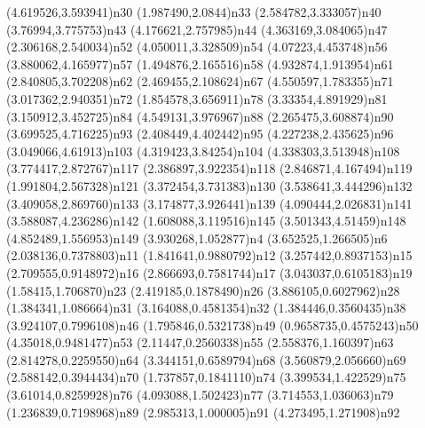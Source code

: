 \dotnode[](4.619526,3.593941){n30}
\dotnode[](1.987490,2.0844){n33}
\dotnode[](2.584782,3.333057){n40}
\dotnode[fillcolor=gray](3.76994,3.775753){n43}
\dotnode[](4.176621,2.757985){n44}
\dotnode[fillcolor=gray](4.363169,3.084065){n47}
\dotnode[](2.306168,2.540034){n52}
\dotnode[](4.050011,3.328509){n54}
\dotnode[](4.07223,4.453748){n56}
\dotnode[](3.880062,4.165977){n57}
\dotnode[](1.494876,2.165516){n58}
\dotnode[](4.932874,1.913954){n61}
\dotnode[fillcolor=gray](2.840805,3.702208){n62}
\dotnode[](2.469455,2.108624){n67}
\dotnode[](4.550597,1.783355){n71}
\dotnode[](3.017362,2.940351){n72}
\dotnode[](1.854578,3.656911){n78}
\dotnode[](3.33354,4.891929){n81}
\dotnode[](3.150912,3.452725){n84}
\dotnode[](4.549131,3.976967){n88}
\dotnode[](2.265475,3.608874){n90}
\dotnode[](3.699525,4.716225){n93}
\dotnode[](2.408449,4.402442){n95}
\dotnode[](4.227238,2.435625){n96}
\dotnode[](3.049066,4.61913){n103}
\dotnode[](4.319423,3.84254){n104}
\dotnode[](4.338303,3.513948){n108}
\dotnode[](3.774417,2.872767){n117}
\dotnode[fillcolor=gray](2.386897,3.922354){n118}
\dotnode[](2.846871,4.167494){n119}
\dotnode[](1.991804,2.567328){n121}
\dotnode[](3.372454,3.731383){n130}
\dotnode[](3.538641,3.444296){n132}
\dotnode[](3.409058,2.869760){n133}
\dotnode[](3.174877,3.926441){n139}
\dotnode[](4.090444,2.026831){n141}
\dotnode[](3.588087,4.236286){n142}
\dotnode[](1.608088,3.119516){n145}
\dotnode[](3.501343,4.51459){n148}
\dotnode[](4.852489,1.556953){n149}
\dotnode[](3.930268,1.052877){n4}
\dotnode[](3.652525,1.266505){n6}
\dotnode[](2.038136,0.7378803){n11}
\dotnode[](1.841641,0.9880792){n12}
\dotnode[](3.257442,0.8937153){n15}
\dotnode[](2.709555,0.9148972){n16}
\dotnode[](2.866693,0.7581744){n17}
\dotnode[](3.043037,0.6105183){n19}
\dotnode[](1.58415,1.706870){n23}
\dotnode[](2.419185,0.1878490){n26}
\dotnode[](3.886105,0.6027962){n28}
\dotnode[](1.384341,1.086664){n31}
\dotnode[](3.164088,0.4581354){n32}
\dotnode[](1.384446,0.3560435){n38}
\dotnode[](3.924107,0.7996108){n46}
\dotnode[](1.795846,0.5321738){n49}
\dotnode[](0.9658735,0.4575243){n50}
\dotnode[](4.35018,0.9481477){n53}
\dotnode[](2.11447,0.2560338){n55}
\dotnode[](2.558376,1.160397){n63}
\dotnode[](2.814278,0.2259550){n64}
\dotnode[](3.344151,0.6589794){n68}
\dotnode[](3.560879,2.056660){n69}
\dotnode[](2.588142,0.3944434){n70}
\dotnode[](1.737857,0.1841110){n74}
\dotnode[](3.399534,1.422529){n75}
\dotnode[](3.61014,0.8259928){n76}
\dotnode[](4.093088,1.502423){n77}
\dotnode[](3.714553,1.036063){n79}
\dotnode[](1.236839,0.7198968){n89}
\dotnode[](2.985313,1.000005){n91}
\dotnode[](4.273495,1.271908){n92}
